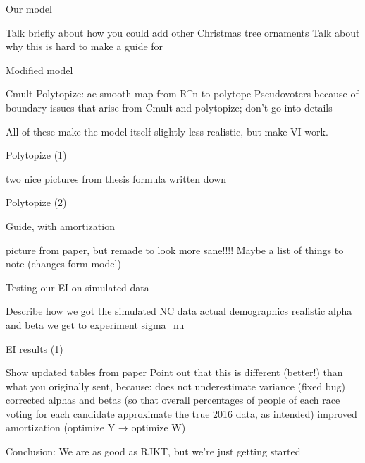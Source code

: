 \documentclass[ignorenonframetext,]{beamer}
\begin{document}
\begin{frame}{Our model}

Talk briefly about how you could add other Christmas tree ornaments Talk
about why this is hard to make a guide for

\end{frame}

\begin{frame}{Modified model}

Cmult Polytopize: ae smooth map from R\^{}n to polytope Pseudovoters
because of boundary issues that arise from Cmult and polytopize; don't
go into details

All of these make the model itself slightly less-realistic, but make VI
work.

\end{frame}

\begin{frame}{Polytopize (1)}

two nice pictures from thesis formula written down

\end{frame}

\begin{frame}{Polytopize (2)}

\end{frame}

\begin{frame}{Guide, with amortization}

picture from paper, but remade to look more sane!!!! Maybe a list of
things to note (changes form model)

\end{frame}

\begin{frame}{Testing our EI on simulated data}

Describe how we got the simulated NC data actual demographics realistic
alpha and beta we get to experiment sigma\_nu

\end{frame}

\begin{frame}{EI results (1)}

Show updated tables from paper Point out that this is different
(better!) than what you originally sent, because: does not underestimate
variance (fixed bug) corrected alphas and betas (so that overall
percentages of people of each race voting for each candidate approximate
the true 2016 data, as intended) improved amortization (optimize Y →
optimize W)

Conclusion: We are as good as RJKT, but we're just getting started

\end{frame}
\end{document}
